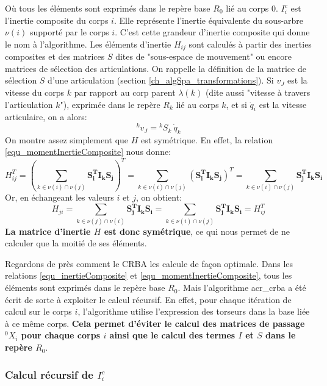 \documentclass{report}
\begin{document}
Où tous les éléments sont exprimés dans le repère base $R_0$ lié au corps $0$. $I_i^c$ est l'inertie composite du corps $i$. Elle représente l'inertie équivalente du sous-arbre $\nu(i)$ supporté par le corps $i$. C'est cette grandeur d'inertie composite qui donne le nom à l'algorithme. Les éléments d'inertie $H_{ij}$ sont calculés à partir des inerties composites et des matrices $S$ dites de "sous-espace de mouvement" ou encore matrices de sélection des articulations. On rappelle  la définition de la matrice de sélection $S$ d'une articulation (section \ref{ch_algSpa_transformations}). Si $v_J$ est la vitesse du corps $k$ par rapport au corp parent $\lambda(k)$ (dite aussi "vitesse à travers l'articulation $k$"), exprimée dans le repère $R_k$ lié au corps $k$, et si $\dot{q}_i$ est la vitesse articulaire, on a alors:
\begin{equation}
{^kv_J} = {^kS_k} \: \dot{q}_k
\end{equation}
On montre assez simplement que $H$ est symétrique. En effet, la relation \eqref{equ_momentInertieComposite} nous donne:
\begin{equation}
{H_{ij}^T} = \left( \sum_{k \in \nu(i) \cap \nu(j)}\mathbf{{S_i^T} I_k S_j} \right)^T 
= \sum_{k \in \nu(i) \cap \nu(j)}\left( \mathbf{{S_i^T} I_k S_j} \right)^T 
= \sum_{k \in \nu(i) \cap \nu(j)}\mathbf{{S_j^T} I_k S_i}
\end{equation}
Or, en échangeant les valeurs $i$ et $j$, on obtient:
\begin{equation}
H_{ji} = \sum_{k \in \nu(j) \cap \nu(i)}\mathbf{{S_j^T} I_k S_i} = \sum_{k \in \nu(i) \cap \nu(j)}\mathbf{{S_j^T} I_k S_i} = {H_{ij}^T}
\end{equation}
\textbf{La matrice d'inertie $H$ est donc symétrique}, ce qui nous permet de ne calculer que la moitié de ses éléments.

Regardons de près comment le CRBA les calcule de façon optimale. Dans les relations \eqref{equ_inertieComposite} et \eqref{equ_momentInertieComposite}, tous les éléments sont exprimés dans le repère base $R_0$. Mais l'algorithme \gls{acr_crba} a été écrit de sorte à exploiter le calcul récursif. En effet, pour chaque itération de calcul sur le corps $i$, l'algorithme utilise l'expression des torseurs dans la base liée à ce même corps. \textbf{Cela permet d'éviter le calcul des matrices de passage $^0X_i$ pour chaque corps $i$ ainsi que le calcul des termes $I$ et $S$ dans le repère $R_0$}.

\subsubsection{Calcul récursif de $I_i^c$}
\end{document}
